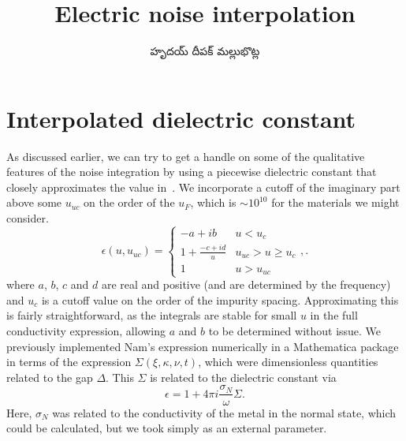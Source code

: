 \documentclass[../main.tex]{subfiles}
\title{Electric noise interpolation}
\author{\begin{telugu}హృదయ్ దీపక్ మల్లుభొట్ల\end{telugu}}
\date{}
\begin{document}
	\graphicspath{{\main/figures/}}

	\onlyinsubfile{\maketitle}

	\section{Interpolated dielectric constant} \label{sec:introine}

	As discussed earlier, we can try to get a handle on some of the qualitative features of the noise integration by using a piecewise dielectric constant that closely approximates the value in~\cite{Nam1967}.
	We incorporate a cutoff of the imaginary part above some $u_{uc}$ on the order of the $u_F$, which is $\sim 10^{10}$ for the materials we might consider.
	\begin{equation}
		\epsilon(u, u_{uc}) =
		\begin{cases}
			-a + i b & u < u_c \\
			1 + \frac{-c + i d}{u} &  u_{uc} > u \geq u_c \\
			1 & u > u_{uc}
		\end{cases}, \label{eq:ine:eps}.
	\end{equation}
	where $a$, $b$, $c$ and $d$ are real and positive (and are determined by the frequency) and $u_c$ is a cutoff value on the order of the impurity spacing.
	Approximating this is fairly straightforward, as the integrals are stable for small $u$ in the full conductivity expression, allowing $a$ and $b$ to be determined without issue.
	We previously implemented Nam's expression numerically in a Mathematica package in terms of the expression $\Sigma(\xi, \kappa, \nu, t)$, which were dimensionless quantities related to the gap $\Delta$.
	This $\Sigma$ is related to the dielectric constant via
	\begin{equation}
		\epsilon = 1 + 4 \pi i \frac{\sigma_N}{\omega} \Sigma.
	\end{equation}
	Here, $\sigma_N$ was related to the conductivity of the metal in the normal state, which could be calculated, but we took simply as an external parameter.
\end{document}
